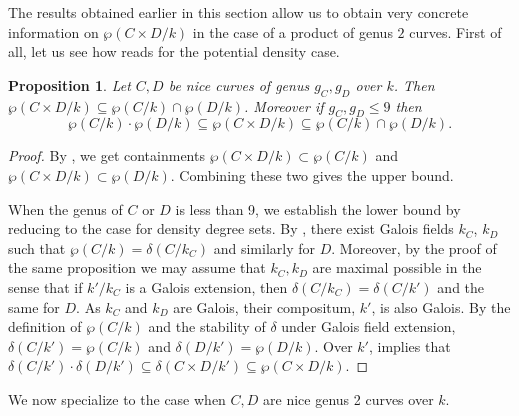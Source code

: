 \documentclass[a4paper,11pt]{amsart}
\theoremstyle{plain}
\newtheorem{prop}[thm]{Proposition}
\theoremstyle{remark}
\newcommand{\dendegs}{\delta}
\newcommand{\potdendegs}{\wp}
\begin{document}
The results obtained earlier in this section allow us to obtain very concrete information on $\wp(C\times D/k)$ in the case of a product of genus $2$ curves.
First of all, let us see how  reads for the potential density case.
\begin{prop}\label{prop:potdegdens}
Let $C,D$ be nice curves of genus $g_C,g_D$ over $k$.
Then $\wp(C\times D / k) \subseteq \potdendegs(C / k) \cap \wp(D / k)$.
Moreover if $g_C,g_D\leq 9$ then 
\[
\potdendegs(C / k) \cdot \wp(D / k) \subseteq \wp(C\times D / k) \subseteq \potdendegs(C / k) \cap \wp(D / k).
\]
\end{prop} 
\begin{proof}

By , we get containments $\potdendegs(C \times D / k) \subset \potdendegs(C / k)$ and $\potdendegs(C \times D / k) \subset \potdendegs(D / k)$. Combining these two gives the upper bound.

When the genus of $C$ or $D$ is less than 9, we establish the lower bound by reducing to the case for density degree sets. By \cite[Proposition 5.5.1]{VV}, there exist Galois fields $k_C$, $k_D$ such that $\potdendegs(C / k) = \dendegs(C / k_C)$ and similarly for $D$. Moreover, by the proof of the same proposition we may assume that $k_C, k_D$ are maximal possible in the sense that if $k'/k_C$ is a Galois extension, then $\dendegs(C/k_C)=\dendegs(C/k')$ and the same for $D$. As $k_C$ and $k_D$ are Galois, their compositum, $k'$, is also Galois. By the definition of $\potdendegs(C / k)$ and the stability of $\dendegs$ under Galois field extension, $\dendegs(C / k') = \potdendegs(C / k)$ and $\dendegs(D / k') = \potdendegs(D / k)$. Over $k'$,  implies that $\dendegs(C / k') \cdot \dendegs(D / k') \subseteq \dendegs(C \times D / k') \subseteq \potdendegs(C \times D / k)$.  
\end{proof}

We now specialize to the case when $C, D$ are nice genus 2 curves over $k$. 
\end{document}
